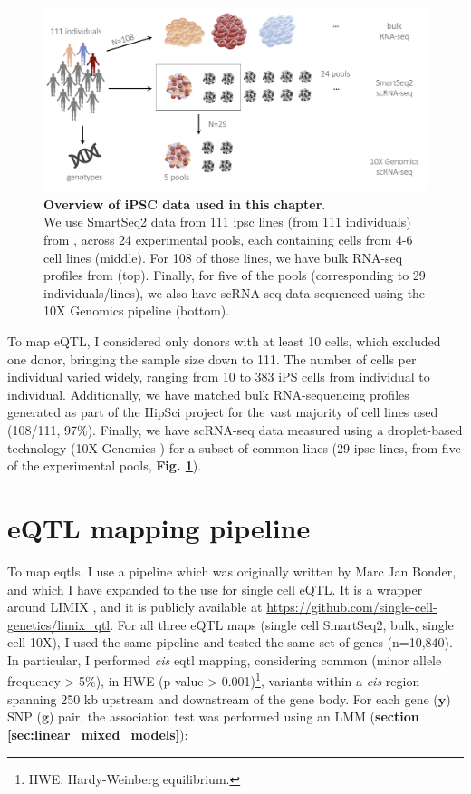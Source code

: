 \begin{figure}[h]
\centering
\includegraphics[width=14cm]{Chapter3/Fig/ips_data.png}
\caption[iPSC data]{\textbf{Overview of iPSC data used in this chapter}.\\
We use SmartSeq2 \cite{purcell2007plink} data from 111 \gls{ipsc} lines (from 111 individuals) from \cite{cuomo2020single}, across 24 experimental pools, each containing cells from 4-6 cell lines (middle).
For 108 of those lines, we have bulk RNA-seq profiles from \cite{mirauta2018population} (top).
Finally, for five of the pools (corresponding to 29 individuals/lines), we also have scRNA-seq data sequenced using the 10X Genomics pipeline \cite{zheng2017massively} (bottom).}
\label{fig:ipsc_data}
\end{figure}

 
To map eQTL, I considered only donors with at least 10 cells, which excluded one donor, bringing the sample size down to 111.
The number of cells per individual varied widely, ranging from 10 to 383 iPS cells from individual to individual.
Additionally, we have matched bulk RNA-sequencing profiles generated as part of the HipSci project \cite{kilpinen2017common} for the vast majority of cell lines used (108/111, 97\%). 
Finally, we have scRNA-seq data measured using a droplet-based technology (10X Genomics \cite{zheng2017massively}) for a subset of common lines (29 \gls{ipsc} lines, from five of the experimental pools, \textbf{Fig. \ref{fig:ipsc_data}}). 

\section{eQTL mapping pipeline}

To map \glspl{eqtl}, I use a pipeline which was originally written by Marc Jan Bonder, and which I have expanded to the use for single cell eQTL. 
It is a wrapper around LIMIX \cite{lippert2014limix, casale2015efficient}, and it is publicly available at \url{https://github.com/single-cell-genetics/limix_qtl}. 
For all three eQTL maps (single cell SmartSeq2, bulk, single cell 10X), I used the same pipeline and tested the same set of genes (n=10,840). 
In particular, I performed \textit{cis} \gls{eqtl} mapping, considering common (minor allele frequency > 5\%), in HWE (p value > 0.001)\footnote{HWE: Hardy-Weinberg equilibrium.}, variants within a \textit{cis}-region spanning 250 kb upstream and downstream of the gene body.
For each gene ($\mathbf{y}$) SNP ($\mathbf{g}$) pair, the association test was performed using an LMM (\textbf{section \ref{sec:linear_mixed_models}}):

